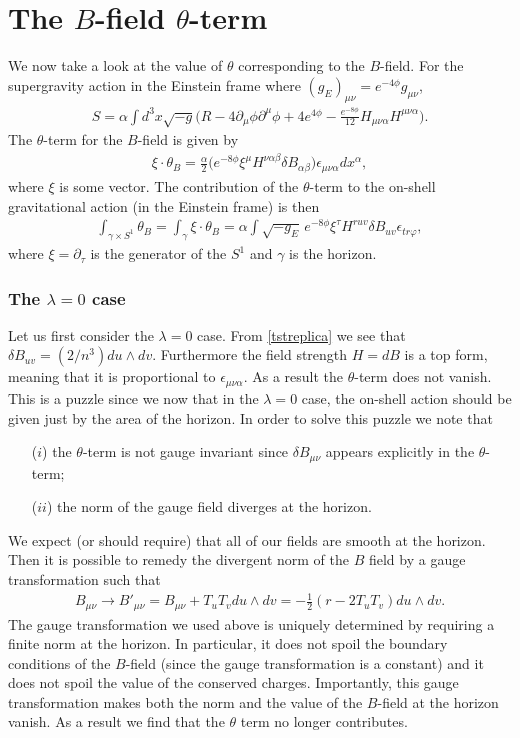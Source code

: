 \documentclass[11pt,a4paper]{article}
\def\p{\partial}
\def\a{\alpha}
\def\b{\beta}
\def\d{\delta}
\def\l{\lambda}
\def\vp{\varphi}
\def\we{\wedge}
\newcommand{\eq}[1]{\begin{align}#1\end{align}}
\begin{document}
\section{The $B$-field $\theta$-term}

We now take a look at the value of $\theta$ corresponding to the $B$-field. For the supergravity action in the Einstein frame where $(g_E)_{\mu\nu} = e^{-4\phi} g_{\mu\nu}$,
\eq{
S = \alpha \int d^3x \sqrt{-g} \Big( R - 4 \p_\mu \phi \p^\mu \phi + 4 e^{4\phi} - \frac{e^{-8\phi}}{12} H_{\mu\nu\a} H^{\mu\nu\a}\Big).
} 
The $\theta$-term for the $B$-field is given by
\eq{
\xi \cdot \theta_B = \frac{\a}{2} \big( e^{-8\phi} \xi^\mu H^{\nu\a\b} \d B_{\a\b}\big) \epsilon_{\mu\nu\a} dx^\a,
}
where $\xi$ is some vector. The contribution of the $\theta$-term to the on-shell gravitational action (in the Einstein frame) is then
\eq{
\int_{\gamma \times S^1} \theta_B = \int_\gamma \xi \cdot \theta_B = \a \int \sqrt{-g_E} \,e^{-8\phi} \xi^\tau H^{ruv} \delta B_{uv}\epsilon_{tr\vp},
}
where $\xi = \p_\tau$ is the generator of the $S^1$ and $\gamma$ is the horizon.

\subsubsection*{The $\l = 0$ case}

Let us first consider the $\l=0$ case. From \eqref{tstreplica} we see that $\delta B_{uv} = (2/n^3) du\we dv$. Furthermore the field strength $H = d B$ is a top form, meaning that it is proportional to $\epsilon_{\mu\nu\a}$. As a result the $\theta$-term does not vanish. This is a puzzle since we now that in the $\l = 0$ case, the on-shell action should be given just by the area of the horizon. In order to solve this puzzle we note that
\begin{itemize}
\item[($i$)] the $\theta$-term is not gauge invariant since $\delta B_{\mu\nu}$ appears explicitly in the $\theta$-term;
\item[($ii$)] the norm of the gauge field diverges at the horizon.
\end{itemize}
We expect (or should require) that all of our fields are smooth at the horizon. Then it is possible to remedy the divergent norm of the $B$ field by a gauge transformation such that 
\eq{
B_{\mu\nu} \to B'_{\mu\nu}  = B_{\mu\nu} + T_u T_v du \we dv = - \frac{1}{2} ( r - 2T_u T_v) du \we dv.
}
The gauge transformation we used above is uniquely determined by requiring a finite norm at the horizon. In particular, it does not spoil the boundary conditions of the $B$-field (since the gauge transformation is a constant) and it does not spoil the value of the conserved charges. Importantly, this gauge transformation makes both the norm and the value of the $B$-field at the horizon vanish. As a result we find that the $\theta$ term no longer contributes.
\end{document}
